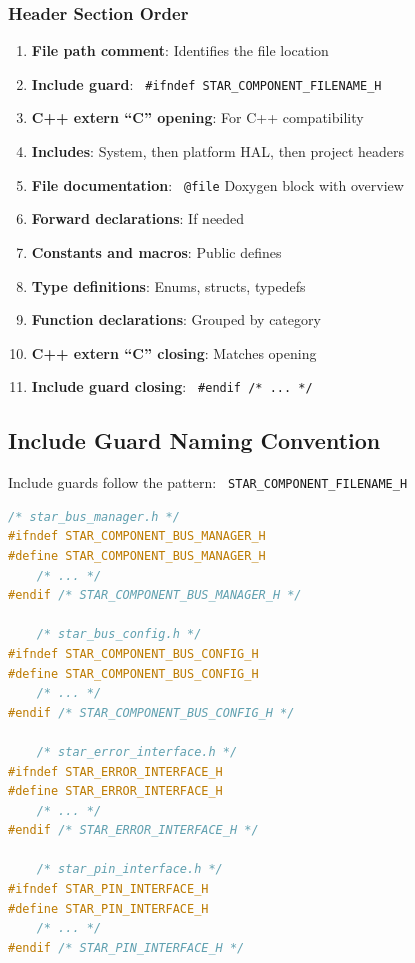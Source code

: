 \subsubsection{Header Section Order}

\begin{enumerate}
    \item \textbf{File path comment}: Identifies the file location
    \item \textbf{Include guard}: \texttt{
      \#ifndef STAR\_COMPONENT\_FILENAME\_H}
    \item \textbf{C++ extern ``C'' opening}: For C++ compatibility
    \item \textbf{Includes}: System, then platform HAL, then project headers
    \item \textbf{File documentation}: \texttt{
      @file} Doxygen block with overview
    \item \textbf{Forward declarations}: If needed
    \item \textbf{Constants and macros}: Public defines
    \item \textbf{Type definitions}: Enums, structs, typedefs
    \item \textbf{Function declarations}: Grouped by category
    \item \textbf{C++ extern ``C'' closing}: Matches opening
    \item \textbf{Include guard closing}: \texttt{
      \#endif /* ... */}
\end{enumerate}

\subsection{Include Guard Naming Convention}

Include guards follow the pattern: \texttt{
      STAR\_COMPONENT\_FILENAME\_H}

\begin{lstlisting}[language=C]
    /* star_bus_manager.h */
#ifndef STAR_COMPONENT_BUS_MANAGER_H
#define STAR_COMPONENT_BUS_MANAGER_H
    /* ... */
#endif /* STAR_COMPONENT_BUS_MANAGER_H */

    /* star_bus_config.h */
#ifndef STAR_COMPONENT_BUS_CONFIG_H
#define STAR_COMPONENT_BUS_CONFIG_H
    /* ... */
#endif /* STAR_COMPONENT_BUS_CONFIG_H */

    /* star_error_interface.h */
#ifndef STAR_ERROR_INTERFACE_H
#define STAR_ERROR_INTERFACE_H
    /* ... */
#endif /* STAR_ERROR_INTERFACE_H */

    /* star_pin_interface.h */
#ifndef STAR_PIN_INTERFACE_H
#define STAR_PIN_INTERFACE_H
    /* ... */
#endif /* STAR_PIN_INTERFACE_H */
\end{lstlisting}

